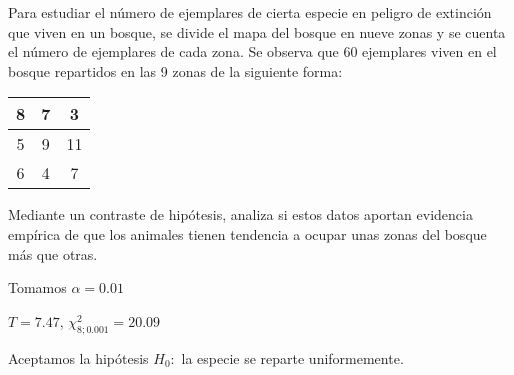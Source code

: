 \begin{problem}[5] Para estudiar el número de ejemplares de cierta especie en peligro de extinción que viven en un
bosque, se divide el mapa del bosque en nueve zonas y se cuenta el número de ejemplares de cada
zona. Se observa que 60 ejemplares viven en el bosque repartidos en las 9 zonas de la siguiente
forma:


\begin{center}
\begin{tabular}{|c|c|c|}
\hline
8&7&3 \\\hline
5&9&11 \\\hline
6&4&7 \\\hline
\end{tabular}
\end{center}

Mediante un contraste de hipótesis, analiza si estos datos aportan evidencia empírica de que los
animales tienen tendencia a ocupar unas zonas del bosque más que otras.

Tomamos $α = 0.01$
\solution

$T = 7.47$, $\chi^2_{8;0.001} = 20.09$

Aceptamos la hipótesis $H_0 : $ la especie se reparte uniformemente.

\end{problem}
